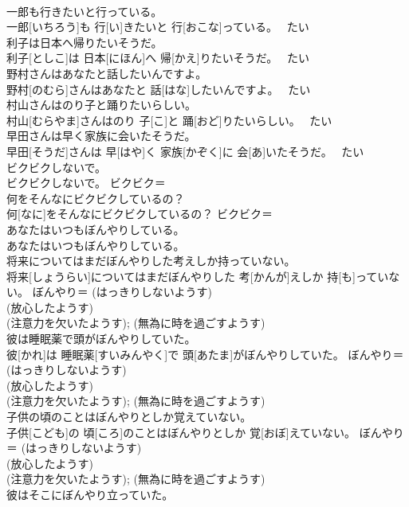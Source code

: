 \documentclass[8pt]{extreport}
\begin{document}
\begin{CJK}{UTF8}{min}
\\	一郎も行きたいと行っている。	
\\	一郎[いちろう]も 行[い]きたいと 行[おこな]っている。	~たい 
\\	利子は日本へ帰りたいそうだ。	
\\	利子[としこ]は 日本[にほん]へ 帰[かえ]りたいそうだ。	~たい 
\\	野村さんはあなたと話したいんですよ。	
\\	野村[のむら]さんはあなたと 話[はな]したいんですよ。	~たい 
\\	村山さんはのり子と踊りたいらしい。	
\\	村山[むらやま]さんはのり 子[こ]と 踊[おど]りたいらしい。	~たい 
\\	早田さんは早く家族に会いたそうだ。	
\\	早田[そうだ]さんは 早[はや]く 家族[かぞく]に 会[あ]いたそうだ。	~たい 
\\	ビクビクしないで。	
\\	ビクビクしないで。	ビクビク＝ 
\\	何をそんなにビクビクしているの？	
\\	何[なに]をそんなにビクビクしているの？	ビクビク＝ 
\\	あなたはいつもぼんやりしている。	
\\	あなたはいつもぼんやりしている。	
\\	将来についてはまだぼんやりした考えしか持っていない。	
\\	将来[しょうらい]についてはまだぼんやりした 考[かんが]えしか 持[も]っていない。	ぼんやり＝ (はっきりしないようす) 
\\	(放心したようす) 
\\	(注意力を欠いたようす); (無為に時を過ごすようす) 
\\	彼は睡眠薬で頭がぼんやりしていた。	
\\	彼[かれ]は 睡眠薬[すいみんやく]で 頭[あたま]がぼんやりしていた。	ぼんやり＝ (はっきりしないようす) 
\\	(放心したようす) 
\\	(注意力を欠いたようす); (無為に時を過ごすようす) 
\\	子供の頃のことはぼんやりとしか覚えていない。	
\\	子供[こども]の 頃[ころ]のことはぼんやりとしか 覚[おぼ]えていない。	ぼんやり＝ (はっきりしないようす) 
\\	(放心したようす) 
\\	(注意力を欠いたようす); (無為に時を過ごすようす) 
\\	彼はそこにぼんやり立っていた。	

\end{CJK}
\end{document}
